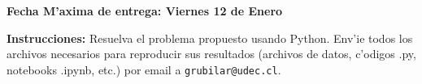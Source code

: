\documentclass[11pt]{exam}
\begin{document}
\firstpageheadrule
\runningheadrule
{}
\cfoot{ }
\begin{flushleft}
\vspace{0.2in}
\vspace{0.25cm}
\end{flushleft}

\begin{center}
\textbf{Fecha M'axima de entrega: Viernes 12 de Enero}
\end{center}
\textbf{Instrucciones:} Resuelva el problema propuesto usando Python. Env'ie todos los archivos necesarios para reproducir sus resultados (archivos de datos, c'odigos .py, notebooks .ipynb, etc.) por email a \texttt{grubilar@udec.cl}.

\bigskip
\end{document}
